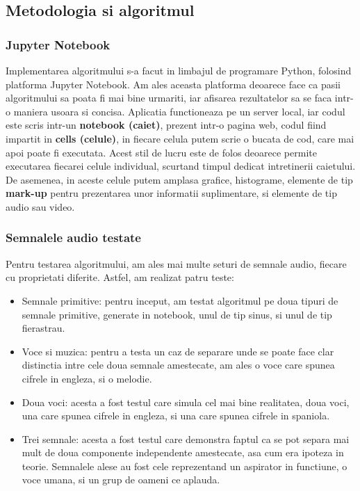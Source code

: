 \documentclass[12pt,oneside]{article}
\begin{document}
\subsection{Metodologia si algoritmul}
\subsubsection{Jupyter Notebook}
Implementarea algoritmului s-a facut in limbajul de programare Python, folosind platforma Jupyter Notebook. Am ales aceasta platforma deoarece face ca pasii algoritmului sa poata fi mai bine urmariti, iar afisarea rezultatelor sa se faca intr-o maniera usoara si concisa. Aplicatia functioneaza pe un server local, iar codul este scris intr-un \textbf{notebook (caiet)}, prezent intr-o pagina web, codul fiind impartit in \textbf{cells (celule)}, in fiecare celula putem scrie o bucata de cod, care mai apoi poate fi executata. Acest stil de lucru este de folos deoarece permite executarea fiecarei celule individual, scurtand timpul dedicat intretinerii caietului. De asemenea, in aceste celule putem amplasa grafice, histograme, elemente de tip \textbf{mark-up} pentru prezentarea unor informatii suplimentare, si elemente de tip audio sau video. 

\subsubsection{Semnalele audio testate}
Pentru testarea algoritmului, am ales mai multe seturi de semnale audio, fiecare cu proprietati diferite. Astfel, am realizat patru teste:
\begin{itemize}
	\item{Semnale primitive: pentru inceput, am testat algoritmul pe doua tipuri de semnale primitive, generate in notebook, unul de tip sinus, si unul de tip fierastrau.\cite{scikit_ica_pca}}
	\item{Voce si muzica: pentru a testa un caz de separare unde se poate face clar distinctia intre cele doua semnale amestecate, am ales o voce care spunea cifrele in engleza, si o melodie.\cite{sound_samples_1}
} 	\item{Doua voci: acesta a fost testul care simula cel mai bine realitatea, doua voci, una care spunea cifrele in engleza, si una care spunea cifrele in spaniola.\cite{sound_samples_1}} 
	\item{Trei semnale: acesta a fost testul care demonstra faptul ca se pot separa mai mult de doua componente independente amestecate, asa cum era ipoteza in teorie. Semnalele alese au fost cele reprezentand un aspirator in functiune, o voce umana, si un grup de oameni ce aplauda.\cite{vsubhashini}}
\end{itemize}
\end{document}
